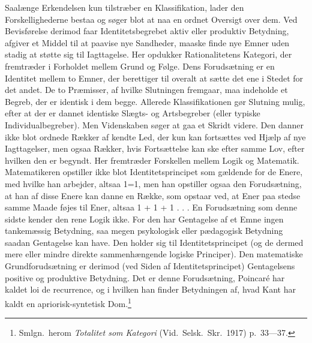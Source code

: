 \documentclass[12pt]{article}
\newcommand{\opage}[1]{\marginnote{\footnotesize\textit{[#1]}}}
\begin{document}
Saalænge Erkendelsen kun tilstræber en Klassifikation,
lader den Forskellighederne bestaa og søger blot at naa en
ordnet Oversigt over dem. Ved Bevisførelse derimod faar
Identitetsbegrebet aktiv eller produktiv Betydning, afgiver
et Middel til at paavise nye Sandheder, maaske finde nye
Emner uden stadig at støtte sig til Iagttagelse. Her opdukker
Rationalitetens Kategori, der fremtræder i Forholdet
mellem Grund og Følge. Dens Forudsætning er en Identitet
mellem to Emner, der berettiger til overalt at sætte det
ene i Stedet for det andet. De to Præmisser, af hvilke Slutningen
fremgaar, maa indeholde et Begreb, der er identisk
i dem begge. Allerede Klassifikationen gør Slutning mulig,
efter at der er dannet identiske Slægts- og Artsbegreber
(eller typiske Individualbegreber). Men Videnskaben søger
at gaa et Skridt videre. Den danner ikke blot ordnede
Rækker af kendte Led, der kun kan fortsættes ved Hjælp
af nye Iagttagelser, men ogsaa Rækker, hvis Fortsættelse
kan ske efter samme Lov, efter hvilken den er begyndt.
Her fremtræder Forskellen mellem Logik og Matematik.
Matematikeren opstiller ikke blot Identitetsprincipet som
gældende for de Enere, med hvilke han arbejder, altsaa
1=1, men han opstiller ogsaa den Forudsætning, at han
af disse Enere kan danne en Række, som opstaar ved, at
Ener paa stedse samme Maade føjes til Ener, altsaa
1 + 1 + 1 . . . En Forudsætning som denne sidste kender
den rene Logik ikke. For den har Gentagelse af et Emne
\opage{38} \setcounter{footnote}{0}
ingen tankemæssig Betydning, saa megen psykologisk eller
pædagogisk Betydning saadan Gentagelse kan have. Den
holder sig til Identitetsprincipet (og de dermed mere eller
mindre direkte sammenhængende logiske Principer). Den
matematiske Grundforudsætning er derimod (ved Siden af
Identitetsprincipet) Gentagelsens positive og produktive Betydning.
Det er denne Forudsætning, Poincaré har kaldet
loi de recurrence, og i hvilken han finder Betydningen af,
hvad Kant har kaldt en apriorisk-syntetisk Dom.\footnote{Smlgn.\ herom
\textit{Totalitet som Kategori} (Vid.\ Selsk.\ Skr.\ 1917) p.~33---37.}
\end{document}
